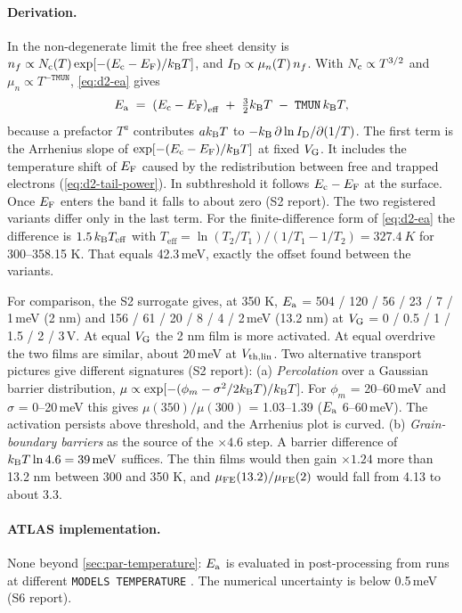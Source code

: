 \paragraph{Derivation.}
\begin{derivation}
In the non-degenerate limit the free sheet density is $n_f\propto N_{\mathrm{c}}(T)\exp[-(E_{\mathrm{c}}-E_{\mathrm{F}})/k_{\mathrm{B}}T]$, and $I_{\mathrm{D}}\propto\mu_n(T)\,n_f$. With $N_{\mathrm{c}}\propto T^{3/2}$ and $\mu_n\propto T^{-\texttt{TMUN}}$, \cref{eq:d2-ea} gives
\begin{equation}
  E_{\mathrm{a}} \;=\; \left(E_{\mathrm{c}}-E_{\mathrm{F}}\right)_{\mathrm{eff}} \;+\; \tfrac32k_{\mathrm{B}}T \;-\; \texttt{TMUN}\,k_{\mathrm{B}}T,
  \label{eq:d2-ea-mtr}
\end{equation}
because a prefactor $T^{a}$ contributes $ak_{\mathrm{B}}T$ to $-k_{\mathrm{B}}\,\partial\ln I_{\mathrm{D}}/\partial(1/T)$. The first term is the Arrhenius slope of $\exp[-(E_{\mathrm{c}}-E_{\mathrm{F}})/k_{\mathrm{B}}T]$ at fixed $V_{\mathrm{G}}$. It includes the temperature shift of $E_{\mathrm{F}}$ caused by the redistribution between free and trapped electrons (\cref{eq:d2-tail-power}). In subthreshold it follows $E_{\mathrm{c}}-E_{\mathrm{F}}$ at the surface. Once $E_{\mathrm{F}}$ enters the band it falls to about zero (S2 report). The two registered variants differ only in the last term. For the finite-difference form of \cref{eq:d2-ea} the difference is $1.5\,k_{\mathrm{B}} T_{\mathrm{eff}}$ with $T_{\mathrm{eff}}=\ln(T_2/T_1)/(1/T_1-1/T_2)=\SI{327.4}{K}$ for 300--358.15 K. That equals 42.3\,meV, exactly the offset found between the variants.
\end{derivation}

For comparison, the S2 surrogate gives, at 350 K, $E_{\mathrm{a}}$ = 504 / 120 / 56 / 23 / 7 / 1\,meV (2 nm) and 156 / 61 / 20 / 8 / 4 / 2\,meV (13.2 nm) at $V_{\mathrm{G}}$ = 0 / 0.5 / 1 / 1.5 / 2 / 3\,V. At equal $V_{\mathrm{G}}$ the 2 nm film is more activated. At equal overdrive the two films are similar, about 20\,meV at $V_{\mathrm{th,lin}}$. Two alternative transport pictures give different signatures (S2 report):
(a) \emph{Percolation} over a Gaussian barrier distribution, $\mu\propto\exp[-(\phi_m-\sigma^{2}/2k_{\mathrm{B}}T)/k_{\mathrm{B}}T]$. For $\phi_m$ = 20--60\,meV and $\sigma$ = 0--20\,meV this gives $\mu(350)/\mu(300)$ = 1.03--1.39 ($E_{\mathrm{a}}$ 6--60\,meV). The activation persists above threshold, and the Arrhenius plot is curved.
(b) \emph{Grain-boundary barriers} as the source of the $\times4.6$ step. A barrier difference of $k_{\mathrm{B}}T\ln4.6=\SI{39}{meV}$ suffices. The thin films would then gain $\times1.24$ more than 13.2 nm between 300 and 350 K, and $\mu_{\mathrm{FE}}(13.2)/\mu_{\mathrm{FE}}(2)$ would fall from 4.13 to about 3.3.

\paragraph{ATLAS implementation.}
None beyond \cref{sec:par-temperature}: $E_{\mathrm{a}}$ is evaluated in post-processing from runs at different \texttt{MODELS TEMPERATURE} \citep[p.~1478]{AtlasManual}. The numerical uncertainty is below 0.5\,meV (S6 report).

